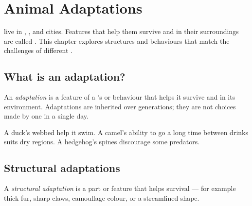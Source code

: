 \chapter{Animal Adaptations}\label{ch:g4:adaptations}

 live in , ,  and cities. Features that help
them survive and  in their surroundings are called
. This chapter explores  structures and behaviours that
match the challenges of different .

\section{What is an adaptation?}

\begin{definition}[Adaptation]\label{def:g4:adaptations:def}
An \emph{adaptation} is a feature of a 's
 or behaviour that helps it survive and  in its
environment. Adaptations are inherited over generations; they are not
choices made by one  in a single day.
\end{definition}

\begin{example}\label{ex:g4:adaptations:quick}
A duck's webbed  help it swim. A camel's ability to go a long time
between drinks suits dry regions. A hedgehog's spines discourage some
predators.
\end{example}

\section{Structural adaptations}

\begin{definition}\label{def:g4:adaptations:struct}
A \emph{structural adaptation} is a 
part or  feature that helps survival --- for example thick fur,
sharp claws, camouflage colour, or a streamlined shape.
\end{definition}


